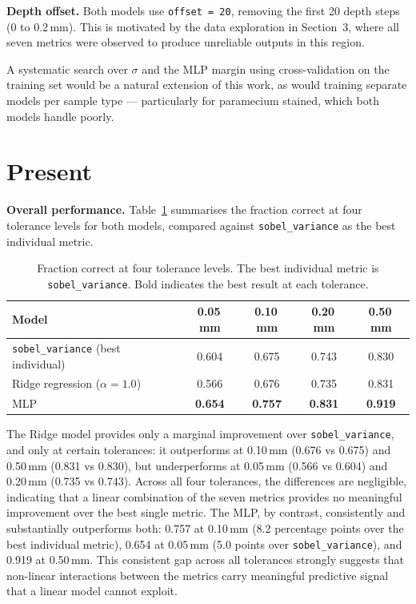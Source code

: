 \documentclass{article}
\begin{document}
\textbf{Depth offset.} Both models use \texttt{offset = 20}, removing the first 20 depth steps (0 to 0.2\,mm). This is motivated by the data exploration in Section~3, where all seven metrics were observed to produce unreliable outputs in this region.

A systematic search over $\sigma$ and the MLP margin using cross-validation on the training set would be a natural extension of this work, as would training separate models per sample type --- particularly for paramecium stained, which both models handle poorly.

\section{Present}

\textbf{Overall performance.} Table~\ref{tab:results} summarises the fraction correct at four tolerance levels for both models, compared against \texttt{sobel\_variance} as the best individual metric.

\begin{table}[htbp]
    \centering
    \caption{Fraction correct at four tolerance levels. The best individual metric is \texttt{sobel\_variance}. Bold indicates the best result at each tolerance.}
    \begin{tabular}{lcccc}
        \toprule
        Model & 0.05\,mm & 0.10\,mm & 0.20\,mm & 0.50\,mm \\
        \midrule
        \texttt{sobel\_variance} (best individual) & 0.604 & 0.675 & 0.743 & 0.830 \\
        Ridge regression ($\alpha = 1.0$)          & 0.566 & 0.676 & 0.735 & 0.831 \\
        MLP                                        & \textbf{0.654} & \textbf{0.757} & \textbf{0.831} & \textbf{0.919} \\
        \bottomrule
    \end{tabular}
    \label{tab:results}
\end{table}

The Ridge model provides only a marginal improvement over \texttt{sobel\_variance}, and only at certain tolerances: it outperforms at 0.10\,mm (0.676 vs 0.675) and 0.50\,mm (0.831 vs 0.830), but underperforms at 0.05\,mm (0.566 vs 0.604) and 0.20\,mm (0.735 vs 0.743). Across all four tolerances, the differences are negligible, indicating that a linear combination of the seven metrics provides no meaningful improvement over the best single metric. The MLP, by contrast, consistently and substantially outperforms both: 0.757 at 0.10\,mm (8.2 percentage points over the best individual metric), 0.654 at 0.05\,mm (5.0 points over \texttt{sobel\_variance}), and 0.919 at 0.50\,mm. This consistent gap across all tolerances strongly suggests that non-linear interactions between the metrics carry meaningful predictive signal that a linear model cannot exploit.
\end{document}
